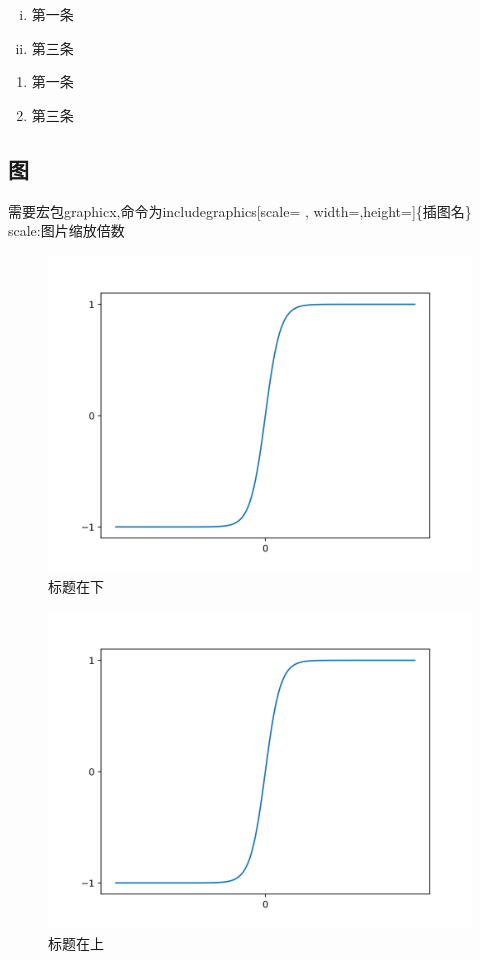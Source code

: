 \documentclass[UTF8,a4paper,8pt,no-math]{article} %
\numberwithin{equation}{section} %
\begin{document}
\begin{enumerate}[i.]
	\item 第一条
	\item 第三条
\end{enumerate}

\begin{enumerate}[step1]
	\item 第一条
	\item 第三条
\end{enumerate}

\subsection{图}
需要宏包graphicx,命令为includegraphics[scale= , width=,height=]\{插图名\} \\
scale:图片缩放倍数

\begin{figure}[htbp] %
	\center %
	\includegraphics[scale=0.5]{tanh.png}
	\caption{标题在下} %
\end{figure}

\begin{figure}[htbp] %
	\center %
	\caption{标题在上} %
	\includegraphics[scale=0.5]{tanh.png}
\end{figure}
\end{document}
